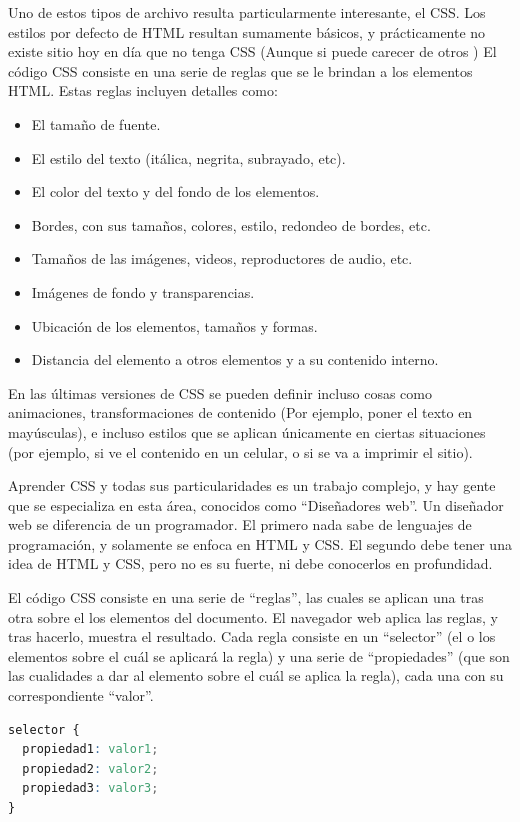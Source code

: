 Uno de estos tipos de archivo resulta particularmente interesante, el CSS.
Los estilos por defecto de HTML resultan sumamente básicos, y prácticamente no
existe sitio hoy en día que no tenga CSS (Aunque si puede carecer de otros
) El código CSS consiste en una serie de reglas que se le brindan a los
elementos HTML. Estas reglas incluyen detalles como:
\begin{itemize}
  \item El tamaño de fuente.
  \item El estilo del texto (itálica, negrita, subrayado, etc).
  \item El color del texto y del fondo de los elementos.
  \item Bordes, con sus tamaños, colores, estilo, redondeo de bordes, etc.
  \item Tamaños de las imágenes, videos, reproductores de audio, etc.
  \item Imágenes de fondo y transparencias.
  \item Ubicación de los elementos, tamaños y formas.
  \item Distancia del elemento a otros elementos y a su contenido interno.
\end{itemize}

En las últimas versiones de CSS se pueden definir incluso cosas como
animaciones, transformaciones de contenido (Por ejemplo, poner el texto
en mayúsculas), e incluso estilos que se aplican únicamente en ciertas
situaciones (por ejemplo, si ve el contenido en un celular, o si se
va a imprimir el sitio).

Aprender CSS y todas sus particularidades es un trabajo complejo, y hay
gente que se especializa en esta área, conocidos como ``Diseñadores web''.
Un diseñador web se diferencia de un programador. El primero nada sabe de
lenguajes de programación, y solamente se enfoca en HTML y CSS. El segundo
debe tener una idea de HTML y CSS, pero no es su fuerte, ni debe conocerlos
en profundidad.

El código CSS consiste en una serie de ``reglas'', las cuales se aplican una
tras otra sobre el los elementos del documento. El navegador web aplica las
reglas, y tras hacerlo, muestra el resultado. Cada regla consiste en un
``selector'' (el o los elementos sobre el cuál se aplicará la regla) y una serie de
``propiedades'' (que son las cualidades a dar al elemento sobre el cuál se aplica
la regla), cada una con su correspondiente ``valor''.

\begin{lstlisting}[language=CSS]
selector {
  propiedad1: valor1;
  propiedad2: valor2;
  propiedad3: valor3;
}
\end{lstlisting}

